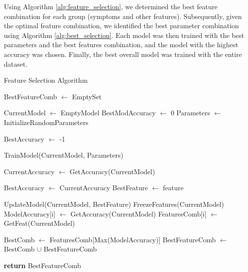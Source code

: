 Using Algorithm \ref{alg:feature_selection}, we determined the best feature combination for each group (symptoms and other features).
Subsequently, given the optimal feature combination, we identified the best parameter combination using Algorithm 
\ref{alg:best_selection}. Each model was then trained with the best parameters and the best features combination, 
and the model with the highest accuracy was chosen. Finally, the best overall model was trained with the entire dataset.


\begin{algorithm}[H] \small
	\caption{Feature Selection Algorithm}\label{alg:feature_selection}
	
	\begin{algorithmic}[1]
	
	\State BestFeatureComb $\gets$ EmptySet
	
	    \State CurrentModel $\gets$ EmptyModel
	    \State BestModAccuracy $\gets$ 0
	    \State Parameters $\gets$ InitializeRandomParameters
	
	    		\State BestAccuracy $\gets$ -1

				\State TrainModel(CurrentModel, Parameters)
			
				\State CurrentAccuracy $\gets$ GetAccuracy(CurrentModel)
			
					\State BestAccuracy $\gets$ CurrentAccuracy
					\State BestFeature $\gets$ feature
					
				\EndIf
				\State UpdateModel(CurrentModel, BestFeature)
			\EndFor
			\State FreezeFeatures(CurrentModel)
			\State ModelAccuracy[i] $\gets$ GetAccuracy(CurrentModel)
			\State FeaturesComb[i] $\gets$ GetFeat(CurrentModel)
	
	    \EndFor
	
	    \State BestComb $\gets$ FeaturesComb[Max(ModelAccuracy)]
	    \State BestFeatureComb $\gets$ BestComb $\cup$ BestFeatureComb
	
	\EndFor
	
	\State \textbf{return} BestFeatureComb
	\end{algorithmic}
\end{algorithm}

